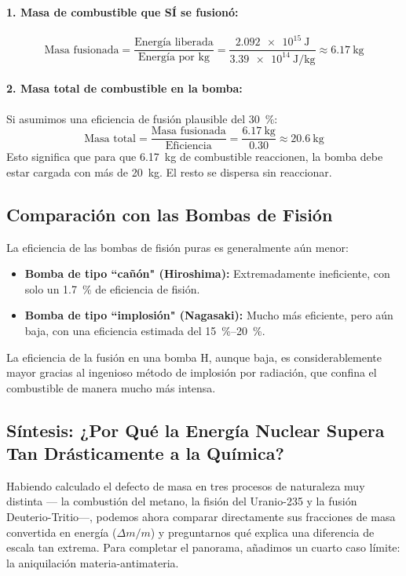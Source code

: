 \documentclass[11pt,a4paper]{book}
\begin{document}
\paragraph{1. Masa de combustible que SÍ se fusionó:}
\[ \text{Masa fusionada} = \frac{\text{Energía liberada}}{\text{Energía por kg}} = \frac{\SI{2.092e15}{\joule}}{\SI{3.39e14}{\joule\per\kilo\gram}} \approx \SI{6.17}{\kilo\gram} \]

\paragraph{2. Masa total de combustible en la bomba:}
Si asumimos una eficiencia de fusión plausible del \SI{30}{\percent}:
\[ \text{Masa total} = \frac{\text{Masa fusionada}}{\text{Eficiencia}} = \frac{\SI{6.17}{\kilo\gram}}{0.30} \approx \SI{20.6}{\kilo\gram} \]
Esto significa que para que \SI{6.17}{\kilo\gram} de combustible reaccionen, la bomba debe estar cargada con más de \SI{20}{\kilo\gram}. El resto se dispersa sin reaccionar.

\subsection*{Comparación con las Bombas de Fisión}
La eficiencia de las bombas de fisión puras es generalmente aún menor:
\begin{itemize}
    \item \textbf{Bomba de tipo ``cañón" (Hiroshima):} Extremadamente ineficiente, con solo un \SI{1.7}{\percent} de eficiencia de fisión.
    \item \textbf{Bomba de tipo ``implosión" (Nagasaki):} Mucho más eficiente, pero aún baja, con una eficiencia estimada del \SIrange{15}{20}{\percent}.
\end{itemize}
La eficiencia de la fusión en una bomba H, aunque baja, es considerablemente mayor gracias al ingenioso método de implosión por radiación, que confina el combustible de manera mucho más intensa.



\subsection*{Síntesis: ¿Por Qué la Energía Nuclear Supera Tan Drásticamente a la Química?}

Habiendo calculado el defecto de masa en tres procesos de naturaleza muy distinta
--- la combustión del metano, la fisión del Uranio-235 y la fusión Deuterio-Tritio---,
podemos ahora comparar directamente sus fracciones de masa convertida en energía
($\Delta m/m$) y preguntarnos qué explica una diferencia de escala tan extrema.
Para completar el panorama, añadimos un cuarto caso límite: la aniquilación
materia-antimateria.
\end{document}
